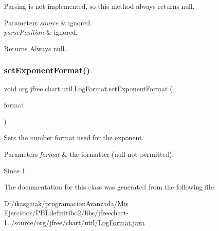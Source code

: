 Parsing is not implemented, so this method always returns {\ttfamily null}.


\begin{DoxyParams}{Parameters}
{\em source} & ignored. \\
\hline
{\em parse\+Position} & ignored.\\
\hline
\end{DoxyParams}
\begin{DoxyReturn}{Returns}
Always {\ttfamily null}. 
\end{DoxyReturn}
\mbox{\label{classorg_1_1jfree_1_1chart_1_1util_1_1_log_format_af445424e9e6a4aed692aa9e61ef69230}} 
\subsubsection{\texorpdfstring{set\+Exponent\+Format()}{setExponentFormat()}}
{\footnotesize\ttfamily void org.\+jfree.\+chart.\+util.\+Log\+Format.\+set\+Exponent\+Format (\begin{DoxyParamCaption}\item[{Number\+Format}]{format }\end{DoxyParamCaption})}

Sets the number format used for the exponent.


\begin{DoxyParams}{Parameters}
{\em format} & the formatter ({\ttfamily null} not permitted).\\
\hline
\end{DoxyParams}
\begin{DoxySince}{Since}
1.. 
\end{DoxySince}


The documentation for this class was generated from the following file\+:\begin{DoxyCompactItemize}
\item 
D\+:/ikasgaiak/programacion\+Avanzada/\+Mis Ejercicios/\+P\+B\+Ldefinitibo2/libs/jfreechart-\/1../source/org/jfree/chart/util/\mbox{\hyperlink{_log_format_8java}{Log\+Format.\+java}}\end{DoxyCompactItemize}
